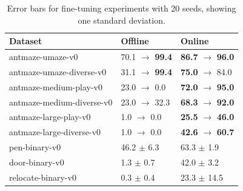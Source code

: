 \begin{table}[!htp]\centering
\begin{tabular}{ L{6cm} ||p{2.8cm} | p{2.8cm}  }
    \centering
    Dataset & Offline & Online \\
    \hline
    antmaze-umaze-v0 & 70.1  $\rightarrow$ \textbf{99.4} & \textbf{86.7}  $\rightarrow$ \textbf{96.0} \\
    antmaze-umaze-diverse-v0 & 31.1  $\rightarrow$ \textbf{99.4} & \textbf{75.0}  $\rightarrow$ 84.0 \\
    antmaze-medium-play-v0 & 23.0  $\rightarrow$ 0.0 & \textbf{72.0}  $\rightarrow$ \textbf{95.0} \\
    antmaze-medium-diverse-v0 & 23.0  $\rightarrow$ 32.3 & \textbf{68.3}  $\rightarrow$ \textbf{92.0} \\
    antmaze-large-play-v0 & 1.0  $\rightarrow$ 0.0 & \textbf{25.5}  $\rightarrow$ \textbf{46.0} \\
    antmaze-large-diverse-v0 & 1.0  $\rightarrow$ 0.0 & \textbf{42.6}  $\rightarrow$ \textbf{60.7} \\ \hline
    pen-binary-v0 & 46.2 $\pm$ 6.3 & 63.3  $\pm$ 1.9 \\
    door-binary-v0 & 1.3  $\pm$ 0.7 & 42.0  $\pm$ 3.2 \\
    relocate-binary-v0 & 0.3  $\pm$ 0.4 & 23.3  $\pm$ 14.5 \\ \hline
\end{tabular}
\caption{Error bars for fine-tuning experiments with 20 seeds, showing one standard deviation.}
\label{tab:finetuning}
\end{table}


